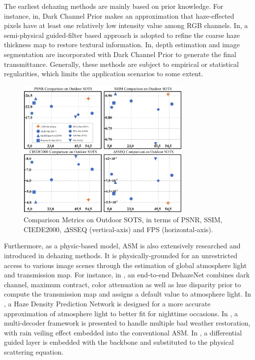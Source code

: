 \documentclass[lettersize,journal]{IEEEtran}
\begin{document}
The earliest dehazing methods are mainly based on prior knowledge. For instance, in\cite{he2010single}, Dark Channel Prior makes an approximation that haze-effected pixels have at least one relatively low intensity value among RGB channels. 
In\cite{liu2021semiphysical}, a semi-physical guided-filter based approach is adopted to refine the coarse haze thickness map to restore textural information. In\cite{xie2021image}, depth estimation and image segmentation are incorporated with Dark Channel Prior to generate the final transmittance. Generally, these methods are subject to empirical or statistical regularities, which limits the application scenarios to some extent.

\begin{figure}[t]
    \centering
    \includegraphics[width=8.5cm]{sample.png}
    \caption{Comparison Metrics on Outdoor SOTS, in terms of PSNR, SSIM, CIEDE2000, $\Delta$SSEQ (vertical-axis) and FPS (horizontal-axis).}
    \label{sample}
\end{figure}

Furthermore, as a physic-based model, ASM is also extensively researched and introduced in dehazing methods. It is physically-grounded for an unrestricted access to various image scenes through the estimation of global atmosphere light and transmission map. For instance, in \cite{cai2016dehazenet}, an end-to-end DehazeNet combines dark channel, maximum contract, color attenuation as well as hue disparity prior to compute the transmission map and assigns a default value to atmosphere light. In \cite{liao2018hdp}, a Haze Density Prediction Network is designed for a more accurate approximation of atmosphere light to better fit for nighttime occasions. In \cite{li2020all}, a multi-decoder framework is presented to handle multiple bad weather restoration, with rain veiling effect embedded into the conventional ASM. In \cite{jiao2021guided}, a differential guided layer is embedded with the backbone and substituted to the physical scattering equation.
\end{document}
